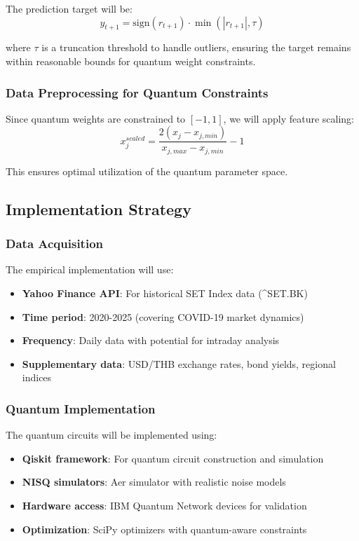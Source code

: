 \documentclass[11pt]{article}
\begin{document}
The prediction target will be:
\begin{equation}
y_{t+1} = \text{sign}(r_{t+1}) \cdot \min(|r_{t+1}|, \tau)
\end{equation}

where $\tau$ is a truncation threshold to handle outliers, ensuring the target remains within reasonable bounds for quantum weight constraints.

\subsubsection{Data Preprocessing for Quantum Constraints}

Since quantum weights are constrained to $[-1, 1]$, we will apply feature scaling:
\begin{equation}
x_j^{scaled} = \frac{2(x_j - x_{j,min})}{x_{j,max} - x_{j,min}} - 1
\end{equation}

This ensures optimal utilization of the quantum parameter space.

\subsection{Implementation Strategy}

\subsubsection{Data Acquisition}

The empirical implementation will use:
\begin{itemize}
\item \textbf{Yahoo Finance API}: For historical SET Index data (^SET.BK)
\item \textbf{Time period}: 2020-2025 (covering COVID-19 market dynamics)
\item \textbf{Frequency}: Daily data with potential for intraday analysis
\item \textbf{Supplementary data}: USD/THB exchange rates, bond yields, regional indices
\end{itemize}

\subsubsection{Quantum Implementation}

The quantum circuits will be implemented using:
\begin{itemize}
\item \textbf{Qiskit framework}: For quantum circuit construction and simulation
\item \textbf{NISQ simulators}: Aer simulator with realistic noise models
\item \textbf{Hardware access}: IBM Quantum Network devices for validation
\item \textbf{Optimization}: SciPy optimizers with quantum-aware constraints
\end{itemize}
\end{document}
